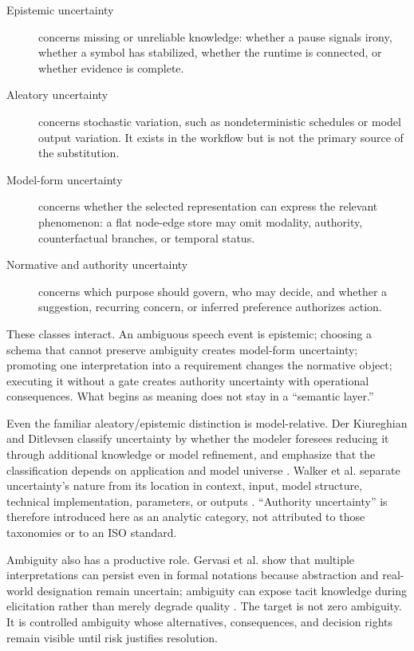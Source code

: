 \documentclass[10pt,a4paper]{article}
\begin{document}
\begin{description}
  \item[Epistemic uncertainty] concerns missing or unreliable knowledge: whether a pause signals irony, whether a symbol has stabilized, whether the runtime is connected, or whether evidence is complete.
  \item[Aleatory uncertainty] concerns stochastic variation, such as nondeterministic schedules or model output variation. It exists in the workflow but is not the primary source of the substitution.
  \item[Model-form uncertainty] concerns whether the selected representation can express the relevant phenomenon: a flat node-edge store may omit modality, authority, counterfactual branches, or temporal status.
  \item[Normative and authority uncertainty] concerns which purpose should govern, who may decide, and whether a suggestion, recurring concern, or inferred preference authorizes action.
\end{description}

These classes interact. An ambiguous speech event is epistemic; choosing a schema that cannot preserve ambiguity creates model-form uncertainty; promoting one interpretation into a requirement changes the normative object; executing it without a gate creates authority uncertainty with operational consequences. What begins as meaning does not stay in a ``semantic layer.''

Even the familiar aleatory/epistemic distinction is model-relative. Der Kiureghian and Ditlevsen classify uncertainty by whether the modeler foresees reducing it through additional knowledge or model refinement, and emphasize that the classification depends on application and model universe \cite{derkiureghian2009}. Walker et al. separate uncertainty's nature from its location in context, input, model structure, technical implementation, parameters, or outputs \cite{walker2003}. ``Authority uncertainty'' is therefore introduced here as an analytic category, not attributed to those taxonomies or to an ISO standard.

Ambiguity also has a productive role. Gervasi et al. show that multiple interpretations can persist even in formal notations because abstraction and real-world designation remain uncertain; ambiguity can expose tacit knowledge during elicitation rather than merely degrade quality \cite{gervasi2019}. The target is not zero ambiguity. It is controlled ambiguity whose alternatives, consequences, and decision rights remain visible until risk justifies resolution.
\end{document}
